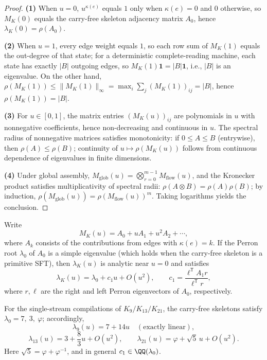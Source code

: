 \begin{proof}
\textbf{(1)} When $u=0$, $u^{\kappa(e)}$ equals $1$ only when $\kappa(e)=0$ and $0$ otherwise, so $M_K(0)$ equals the carry-free skeleton adjacency matrix $A_0$, hence $\lambda_K(0)=\rho(A_0)$.

\textbf{(2)} When $u=1$, every edge weight equals $1$, so each row sum of $M_K(1)$ equals the out-degree of that state; for a deterministic complete-reading machine, each state has exactly $|B|$ outgoing edges, so $M_K(1)\mathbf{1}=|B|\mathbf{1}$, i.e., $|B|$ is an eigenvalue. On the other hand, $\rho(M_K(1))\le \|M_K(1)\|_{\infty}=\max_i\sum_j (M_K(1))_{ij}=|B|$, hence $\rho(M_K(1))=|B|$.

\textbf{(3)} For $u\in[0,1]$, the matrix entries $(M_K(u))_{ij}$ are polynomials in $u$ with nonnegative coefficients, hence non-decreasing and continuous in $u$. The spectral radius of nonnegative matrices satisfies monotonicity: if $0\le A\le B$ (entrywise), then $\rho(A)\le \rho(B)$; continuity of $u\mapsto \rho(M_K(u))$ follows from continuous dependence of eigenvalues in finite dimensions.

\textbf{(4)} Under global assembly, $M_{\mathrm{glob}}(u)=\bigotimes_{r=0}^{m-1} M_{\mathrm{flow}}(u)$, and the Kronecker product satisfies multiplicativity of spectral radii: $\rho(A\otimes B)=\rho(A)\rho(B)$; by induction, $\rho(M_{\mathrm{glob}}(u))=\rho(M_{\mathrm{flow}}(u))^m$. Taking logarithms yields the conclusion.
\end{proof}

\begin{proposition}\label{prop:lambda-linear-response}
Write
\[
M_K(u)=A_0+uA_1+u^2A_2+\cdots,
\]
where $A_k$ consists of the contributions from edges with $\kappa(e)=k$. If the Perron root $\lambda_0$ of $A_0$ is a simple eigenvalue (which holds when the carry-free skeleton is a primitive SFT), then $\lambda_K(u)$ is analytic near $u=0$ and satisfies
\[
\lambda_K(u)=\lambda_0+c_1u+O(u^2),
\qquad
c_1=\frac{\ell^{\mathsf T}A_1 r}{\ell^{\mathsf T}r},
\]
where $r,\ell$ are the right and left Perron eigenvectors of $A_0$, respectively.
\end{proposition}

\begin{corollary}\label{cor:lambda-linear-response-kernels}
For the single-stream compilations of $K_9/K_{13}/K_{21}$, the carry-free skeletons satisfy
\(
\lambda_0=7,\ 3,\ \varphi
\); accordingly,
\[
\lambda_{9}(u)=7+14u\quad(\text{exactly linear}),
\]
\[
\lambda_{13}(u)=3+\frac{8}{3}u+O(u^2),
\qquad
\lambda_{21}(u)=\varphi+\sqrt5\,u+O(u^2).
\]
Here $\sqrt5=\varphi+\varphi^{-1}$, and in general $c_1\in\QQ(\lambda_0)$.
\end{corollary}

